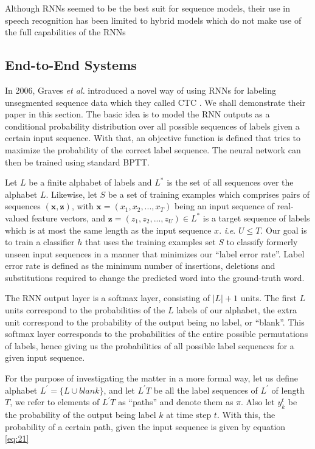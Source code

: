 Although \ac{RNN}s seemed to be the best suit for sequence models, their use in speech recognition has been limited to hybrid models which do not make use of the full capabilities of the \ac{RNN}s




\subsection{End-to-End Systems} 
\label{bg:sub7}


In 2006, Graves \textit{et al.} introduced a novel way of using \ac{RNN}s for labeling unsegmented sequence data which they called \ac{CTC} \cite{graves2006connectionist}. We shall demonstrate their paper in this section. 
The basic idea is to model the \ac{RNN} outputs as a conditional probability distribution over all possible sequences of labels given a certain input sequence. With that, an objective function is defined that tries to maximize the probability of the correct label sequence. The neural network can then be trained using standard \ac{BPTT}.

Let $L$ be a finite alphabet of labels and $L^*$ is the set of all sequences over the alphabet $L$. Likewise, let $S$ be a set of training examples which comprises pairs of sequences $(\mathbf{x},\mathbf{z})$, with $\mathbf{x} = (x_1, x_2,..., x_T)$ being an input sequence of real-valued feature vectors, and $\mathbf{z} = (z_1, z_2,..., z_U) \in L^*$ is a target sequence of labels which is at most the same length as the input sequence $x$. \textit{i}.\textit{e}. $U \leq T$. Our goal is to train a classifier $h$ that uses the training examples set $S$ to classify formerly unseen input sequences in a manner that minimizes our \enquote{label error rate}. Label error rate is defined as the minimum number of insertions, deletions and substitutions required to change the predicted word into the ground-truth word.

The \ac{RNN} output layer is a softmax layer, consisting of $|L|+1$ units. The first $L$ units correspond to the probabilities of the $L$ labels of our alphabet, the extra unit correspond to the probability of the output being no label, or \enquote{blank}. This softmax layer corresponds to the probabilities of the entire possible permutations of labels, hence giving us the probabilities of all possible label sequences for a given input sequence.


For the purpose of investigating the matter in a more formal way, let us define alphabet $L^{'} = \{L \cup {blank}\}$, and let ${L^{'}T}$ be all the label sequences of $L^{'}$ of length $T$, we refer to elements of ${L^{'}T}$ as \enquote{paths} and denote them as $\pi$. Also let $y_{k}^{t}$ be the probability of the output being label $k$ at time step $t$. With this, the probability of a certain path, given the input sequence is given by equation \ref{eq:21}

